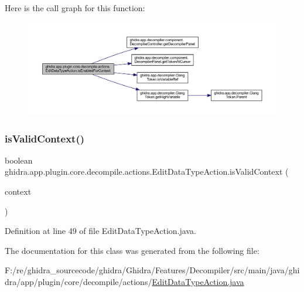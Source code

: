 Here is the call graph for this function\+:
\nopagebreak
\begin{figure}[H]
\begin{center}
\leavevmode
\includegraphics[width=350pt]{classghidra_1_1app_1_1plugin_1_1core_1_1decompile_1_1actions_1_1_edit_data_type_action_a12994abff238287eec91cc98cc89d219_cgraph}
\end{center}
\end{figure}
\mbox{\label{classghidra_1_1app_1_1plugin_1_1core_1_1decompile_1_1actions_1_1_edit_data_type_action_a037378f65a1a1d024a9772ef029e99dd}} 
\subsubsection{\texorpdfstring{isValidContext()}{isValidContext()}}
{\footnotesize\ttfamily boolean ghidra.\+app.\+plugin.\+core.\+decompile.\+actions.\+Edit\+Data\+Type\+Action.\+is\+Valid\+Context (\begin{DoxyParamCaption}\item[{Action\+Context}]{context }\end{DoxyParamCaption})\hspace{0.3cm}{\ttfamily [inline]}}



Definition at line 49 of file Edit\+Data\+Type\+Action.\+java.



The documentation for this class was generated from the following file\+:\begin{DoxyCompactItemize}
\item 
F\+:/re/ghidra\+\_\+sourcecode/ghidra/\+Ghidra/\+Features/\+Decompiler/src/main/java/ghidra/app/plugin/core/decompile/actions/\mbox{\hyperlink{_edit_data_type_action_8java}{Edit\+Data\+Type\+Action.\+java}}\end{DoxyCompactItemize}
